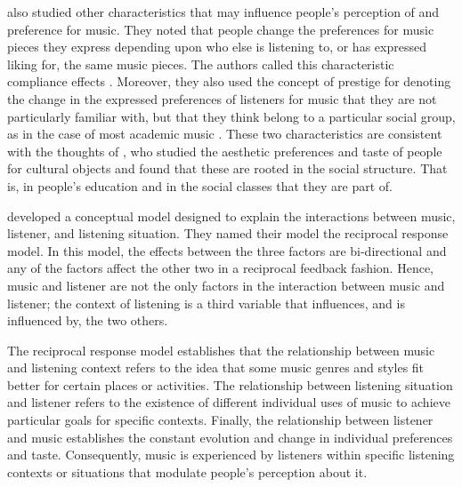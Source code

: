 \citeauthor{north08musical} also studied other characteristics that may influence people's perception of and preference for music.
They noted that people change the preferences for music pieces they express depending upon who else is listening to, or has expressed liking for, the same music pieces. The authors called this characteristic compliance effects \autocite{north08musical}. %
Moreover, they also used the concept of prestige for denoting the change in the expressed preferences of listeners for music that they are not particularly familiar with, but that they think belong to a particular social group, as in the case of most academic music \autocite{north07lifestyle}. 
These two characteristics are consistent with the thoughts of \textcite{bourdieu84distinction}, who studied the aesthetic preferences and taste of people for cultural objects and found that these are rooted in the social structure. That is, in people's education and in the social classes that they are part of.

\textcite{hargreaves05how} developed a conceptual model designed to explain the interactions between music, listener, and listening situation. They named their model the reciprocal response model.
In this model, the effects between the three factors are bi-directional and any of the factors affect the other two in a  reciprocal feedback fashion.
Hence, music and listener are not the only factors in the interaction between music and listener; the context of listening is a third variable that influences, and is influenced by, the two others. 

The reciprocal response model establishes that the relationship between music and listening context refers to the idea that some music genres and styles fit better for certain places or activities. 
The relationship between listening situation and listener refers to the existence of different individual uses of music to achieve particular goals for specific contexts. 
Finally, the relationship between listener and music establishes the constant evolution and change in individual preferences and taste. Consequently, music is experienced by listeners within specific listening contexts or situations that modulate people's perception about it.


